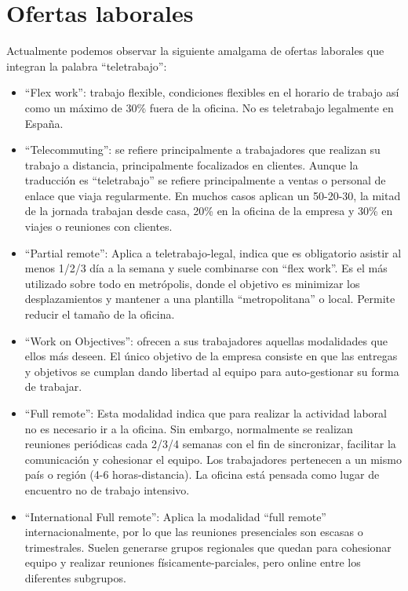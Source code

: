 \section{Ofertas laborales}
Actualmente podemos observar la siguiente amalgama de ofertas laborales que integran la palabra “teletrabajo”:
\begin{itemize}
    \item “Flex work”: trabajo flexible, condiciones flexibles en el horario de trabajo así como un máximo de 30\% fuera de la oficina. No es teletrabajo legalmente en España.

    \item “Telecommuting”: se refiere principalmente a trabajadores que realizan su trabajo a distancia, principalmente focalizados en clientes. Aunque la traducción es “teletrabajo” se refiere principalmente a ventas o personal de enlace que viaja regularmente. En muchos casos aplican un 50-20-30, la mitad de la jornada trabajan desde casa, 20\% en la oficina de la empresa y 30\% en viajes o reuniones con clientes.
    
    \item “Partial remote”: Aplica a teletrabajo-legal, indica que es obligatorio asistir al menos 1/2/3 día a la semana y suele combinarse con “flex work”. Es el más utilizado sobre todo en metrópolis, donde el objetivo es minimizar los desplazamientos y mantener a una plantilla “metropolitana” o local. Permite reducir el tamaño de la oficina.

    \item “Work on Objectives”: ofrecen a sus trabajadores aquellas modalidades que ellos más deseen. El único objetivo de la empresa consiste en que las entregas y objetivos se cumplan dando libertad al equipo para auto-gestionar su forma de trabajar.
    
    \item “Full remote”: Esta modalidad indica que para realizar la actividad laboral no es necesario ir a la oficina. Sin embargo, normalmente se realizan reuniones periódicas cada 2/3/4 semanas con el fin de sincronizar, facilitar la comunicación y cohesionar el equipo. Los trabajadores pertenecen a un mismo país o región (4-6 horas-distancia). La oficina está pensada como lugar de encuentro no de trabajo intensivo.
    
    \item “International Full remote”: Aplica la modalidad “full remote” internacionalmente, por lo que las reuniones presenciales son escasas o trimestrales. Suelen generarse grupos regionales que quedan para cohesionar equipo y realizar reuniones físicamente-parciales, pero online entre los diferentes subgrupos.
    

\end{itemize}
